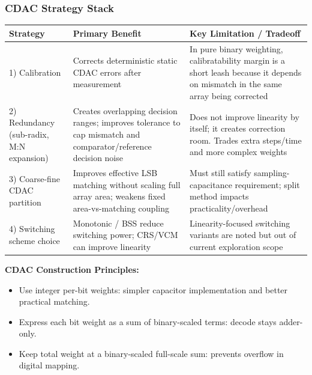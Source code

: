 \documentclass[aspectratio=169]{beamer}
\begin{document}
\begin{frame}
  \frametitle{CDAC Strategy Stack}
  \tiny
  \begin{center}
    \begin{tabular}{p{2.2cm}|p{4.2cm}|p{4.8cm}}
      \hline
      \textbf{Strategy} & \textbf{Primary Benefit} & \textbf{Key Limitation / Tradeoff} \\
      \hline
      1) Calibration &
      Corrects deterministic static CDAC errors after measurement &
      In pure binary weighting, calibratability margin is a short leash because it depends on mismatch in the same array being corrected \\
      \hline
      2) Redundancy (sub-radix, M:N expansion) &
      Creates overlapping decision ranges; improves tolerance to cap mismatch and comparator/reference decision noise &
      Does not improve linearity by itself; it creates correction room. Trades extra steps/time and more complex weights \\
      \hline
      3) Coarse-fine CDAC partition &
      Improves effective LSB matching without scaling full array area; weakens fixed area-vs-matching coupling &
      Must still satisfy sampling-capacitance requirement; split method impacts practicality/overhead \\
      \hline
      4) Switching scheme choice &
      Monotonic / BSS reduce switching power; CRS/VCM can improve linearity &
      Linearity-focused switching variants are noted but out of current exploration scope \\
      \hline
    \end{tabular}
  \end{center}
  \vspace{0.2em}
  \tiny
  \textbf{CDAC Construction Principles:}
  \begin{itemize}
    \item Use integer per-bit weights: simpler capacitor implementation and better practical matching.
    \item Express each bit weight as a sum of binary-scaled terms: decode stays adder-only.
    \item Keep total weight at a binary-scaled full-scale sum: prevents overflow in digital mapping.
  \end{itemize}
\end{frame}
\end{document}
